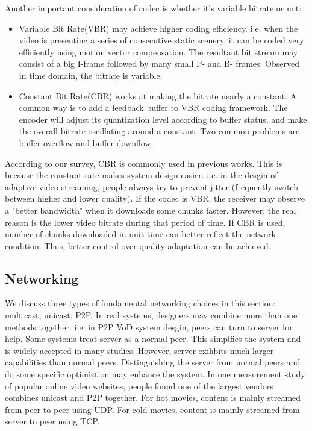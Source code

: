 \documentclass[11pt,a4paper]{article}
\begin{document}
Another important consideration of codec is whether 
it's variable bitrate or not:
\begin{itemize}
	\item Variable Bit Rate(VBR) may achieve higher coding 
	efficiency. i.e. when the video is presenting a series of
	consecutive static scenery, it can be coded very efficiently 
	using motion vector compensation. The resultant bit stream 
	may consist of a big I-frame followed by many small P- and 
	B- frames. Observed in time domain, the bitrate is variable. 
	\item Constant Bit Rate(CBR) works at making the bitrate nearly 
	a constant. A common way is to add a feedback buffer to VBR coding
	framework\cite{liu2003adaptive}. The encoder will adjust its 
	quantization level according to buffer status, and make the overall 
	bitrate oscillating around a constant. Two common problems are 
	buffer overflow and buffer downflow. 
\end{itemize}
According to our survey, CBR is commonly used in previous works. This is 
because the constant rate makes system design easier. i.e. in the desgin 
of adaptive video streaming, people always try to prevent jitter
(frequently switch between higher and lower quality). If the codec is
VBR, the receiver may observe a "better bandwidth" when it downloads 
some chunks faster. However, the real reason is the lower video bitrate
during that period of time. If CBR is used, number of chunks downloaded 
in unit time can better reflect the network condition. Thus, better
control over quality adaptation can be achieved. 


\subsection{Networking}

We discuss three types of fundamental networking choices in 
this section: multicast, unicast, P2P. 
In real systems, designers may combine more than one
methods together. i.e. in P2P VoD system desgin, peers can turn to 
server for help. Some systems treat server as a normal peer. This 
simpifies the system and is widely accepted in many studies. However, 
server exihbits much larger capabilities than normal peers. 
Distinguishing the server from normal peers and do some specific optimiztion
may enhance the system. 
In one measurement study of popular online video websites\cite{ierg5270}, 
people found one of the largest vendors combines unicast and P2P together. 
For hot movies, content is mainly streamed from peer to peer using UDP. 
For cold movies, content is mainly streamed from server to peer using TCP. 
\end{document}
